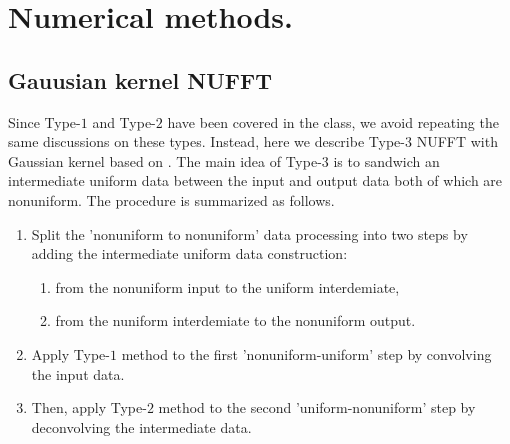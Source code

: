 \section{Numerical methods.}


\subsection{Gauusian kernel NUFFT}
Since Type-$1$ and Type-$2$ have been covered in the class, we avoid repeating the same discussions on these types.
Instead, here we describe Type-$3$ NUFFT with Gaussian kernel based on \cite{JCP-2003-Greengard}.
The main idea of Type-$3$ is to sandwich an intermediate uniform data between the input and output data both of which are nonuniform.
The procedure is summarized as follows.
\begin{enumerate}
  \item Split the 'nonuniform to nonuniform' data processing into two steps
  by adding the intermediate uniform data construction:
  \begin{enumerate}
    \item from the nonuniform input to the uniform interdemiate,
    \item from the nuniform interdemiate to the nonuniform output.
  \end{enumerate}
  \item Apply Type-$1$ method to the first 'nonuniform-uniform' step by convolving the input data.
  \item Then, apply Type-$2$ method to the second 'uniform-nonuniform' step by deconvolving the intermediate data.
\end{enumerate}

